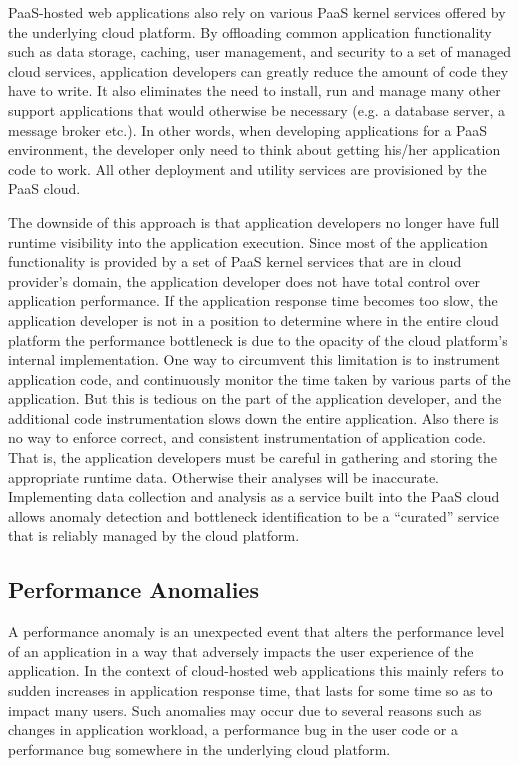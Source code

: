 PaaS-hosted web applications also rely on various PaaS kernel services offered by the underlying
cloud platform. By offloading common application functionality such as data storage, caching,
user management, and security to a set of managed cloud services, application developers
can greatly reduce the amount of code they have to write. It also eliminates the need to install, run and
manage many other support applications that would otherwise be necessary (e.g. a database server, 
a message broker etc.). In other words, when developing applications for a PaaS environment, the
developer only need to think about getting his/her application code to work. All other deployment
and utility services are provisioned by the PaaS cloud. 

The downside of this approach is that application developers no longer have full runtime visibility
into the application execution. Since most of the application functionality is provided by a set 
of PaaS kernel services that are in cloud provider's domain, the application
developer does not have total control over application performance. If the application 
response time becomes too slow, the application developer is not in a position to determine
where in the entire cloud platform the performance bottleneck is due to the opacity of the cloud
platform's internal implementation. One way to circumvent this 
limitation is to instrument application code, and continuously monitor the time taken by various
parts of the application. But this is tedious on the part of the application developer, and
the additional code instrumentation slows down the entire application. 
Also there is no way to enforce correct, and consistent instrumentation of application code.  
That is, the application developers must be careful in gathering and storing the appropriate
runtime data. Otherwise their analyses will be inaccurate.
Implementing data collection and analysis as a service built into the PaaS cloud allows 
anomaly detection and bottleneck identification to be a ``curated'' service that is 
reliably managed by the cloud platform.

\subsection{Performance Anomalies}

A performance anomaly is an unexpected event that alters the performance level of an
application in a way that adversely impacts the user experience of the application. In the context
of cloud-hosted web applications this mainly refers to sudden increases in application
response time, that lasts for some time so as to impact many users. Such anomalies 
may occur due to several reasons such as changes in
application workload, a performance bug in the user code or a performance bug somewhere
in the underlying cloud platform.

